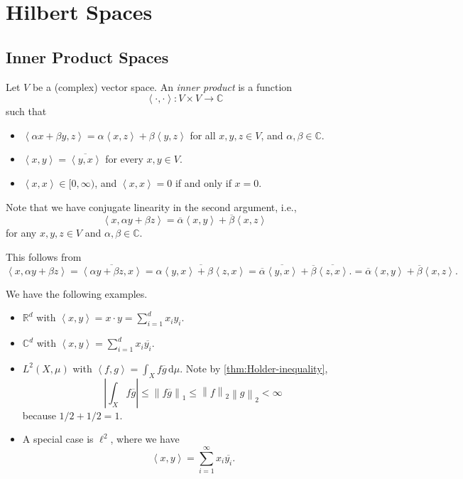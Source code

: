 \chapter{Hilbert Spaces}
\section{Inner Product Spaces}
\begin{definition}\label{def:inner-product}
	Let \(V\) be a (complex) vector space. An \emph{inner product} is a function
	\[
		\left< \cdot,\cdot \right> \colon V \times V \to \mathbb{C}
	\]
	such that
	\begin{itemize}
		\item \(\left< \alpha x + \beta y, z \right> = \alpha \left< x , z \right> + \beta \left< y, z \right>\) for all \(x,y,z \in V\), and \(\alpha,\beta \in \mathbb{C}\).
		\item \(\left< x,y \right> = \overline{\left< y,x \right>}\) for every \(x,y \in V\).
		\item \(\left< x,x \right> \in [0,\infty)\), and \(\left< x,x \right> = 0\) if and only if \(x = 0\).
	\end{itemize}
\end{definition}
\begin{note}
	Note that we have conjugate linearity in the second argument, i.e.,
	\[
		\left< x, \alpha y + \beta z \right> = \overline{\alpha}\left< x,y \right> + \overline{\beta}\left< x,z \right>
	\]
	for any \(x,y,z \in V\) and \(\alpha,\beta \in \mathbb{C}\).
\end{note}
\begin{explanation}
	This follows from
	\[
		\left< x, \alpha y + \beta z \right>
		= \overline{\left< \alpha y + \beta z, x \right> }
		= \overline{\alpha \left< y, x \right> + \beta \left< z, x \right> }
		= \overline{\alpha} \overline{\left< y, x \right>} + \overline{\beta} \overline{\left< z, x \right>}.
		= \overline{\alpha} \left< x, y \right> + \overline{\beta} \left< x, z \right>.
	\]
\end{explanation}

\begin{eg}
	We have the following examples.
	\begin{itemize}
		\item \(\mathbb{R}^d\) with \(\left< x,y \right> = x \cdot y = \sum_{i=1}^d x_i y_i\).
		\item \(\mathbb{C}^d\) with \(\left< x,y \right> = \sum_{i=1}^d x_i \overline{y_i}\).
		\item \(L^2(X,\mu)\) with \(\left< f,g \right> = \int_X f\overline{g}\,\mathrm{d} \mu\). Note by \autoref{thm:Holder-inequality},
		      \[
			      \left\vert \int_X f \overline{g} \right\vert \leq \left\lVert f\overline{g}\right\rVert_1 \leq \left\lVert f\right\rVert_2 \left\lVert g\right\rVert_2 < \infty
		      \]
		      because \(1/2 + 1/2 = 1\).
		\item A special case is \(\ell^2\), where we have
		      \[
			      \left< x,y \right>  = \sum_{i=1}^\infty x_i\overline{y_i}.
		      \]
	\end{itemize}
\end{eg}

